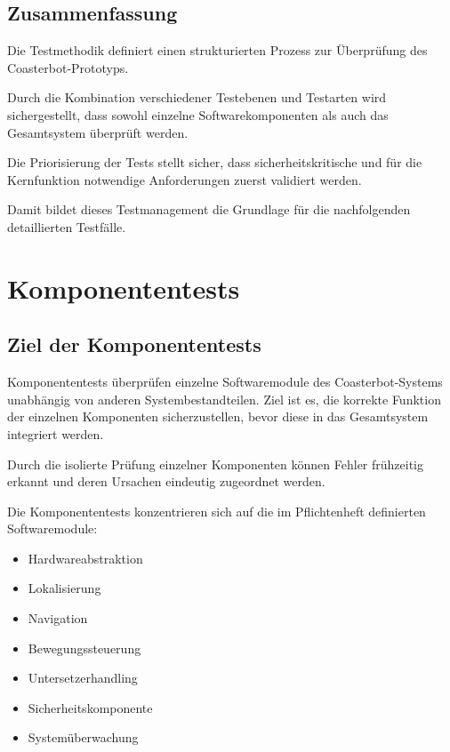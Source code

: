 \documentclass[
  a4paper,
  12pt,
  DIV=12,        %
  parskip=half,  %
  headings=small %
]{scrartcl}
\theoremstyle{definition}
\providecommand{\tightlist}{%
  \setlength{\itemsep}{0pt}\setlength{\parskip}{0pt}}
\theoremstyle{definition}
\begin{document}
\subsection{Zusammenfassung}\label{zusammenfassung-1}

Die Testmethodik definiert einen strukturierten Prozess zur Überprüfung
des Coasterbot-Prototyps.

Durch die Kombination verschiedener Testebenen und Testarten wird
sichergestellt, dass sowohl einzelne Softwarekomponenten als auch das
Gesamtsystem überprüft werden.

Die Priorisierung der Tests stellt sicher, dass sicherheitskritische und
für die Kernfunktion notwendige Anforderungen zuerst validiert werden.

Damit bildet dieses Testmanagement die Grundlage für die nachfolgenden
detaillierten Testfälle.

\section{Komponententests}\label{komponententests-1}

\subsection{Ziel der Komponententests}\label{ziel-der-komponententests}

Komponententests überprüfen einzelne Softwaremodule des
Coasterbot-Systems unabhängig von anderen Systembestandteilen. Ziel ist
es, die korrekte Funktion der einzelnen Komponenten sicherzustellen,
bevor diese in das Gesamtsystem integriert werden.

Durch die isolierte Prüfung einzelner Komponenten können Fehler
frühzeitig erkannt und deren Ursachen eindeutig zugeordnet werden.

Die Komponententests konzentrieren sich auf die im Pflichtenheft
definierten Softwaremodule:

\begin{itemize}
\tightlist
\item
  Hardwareabstraktion
\item
  Lokalisierung
\item
  Navigation
\item
  Bewegungssteuerung
\item
  Untersetzerhandling
\item
  Sicherheitskomponente
\item
  Systemüberwachung
\end{itemize}
\end{document}
